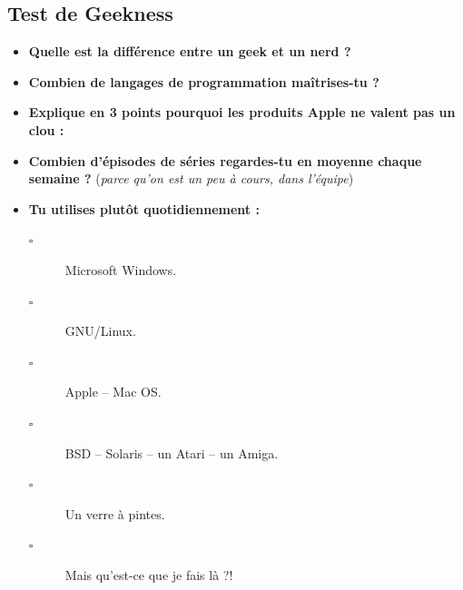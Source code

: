 \subsection*{Test de Geekness}
\begin{itemize}
    \item \textbf{Quelle est la différence entre un geek et un nerd ?}
    \vspace{1cm}
    \item \textbf{Combien de langages de programmation maîtrises-tu ?}
    \vspace{1cm}
    \item \textbf{Explique en 3 points pourquoi les produits Apple ne valent
	pas un clou :}
    \vspace{2cm}
    \item \textbf{Combien d'épisodes de séries regardes-tu en moyenne chaque
	semaine ?} (\emph{parce qu'on est un peu à cours, dans l'équipe})
    \vspace{2cm}
    
    \item \textbf{Tu utilises plutôt quotidiennement :}
    \begin{description}
	\item[$\square$] Microsoft Windows.
	\item[$\square$] GNU/Linux.
	\item[$\square$] Apple -- Mac OS.
	\item[$\square$] BSD -- Solaris -- un Atari -- un Amiga.
	\item[$\square$] Un verre à pintes.
	\item[$\square$] Mais qu'est-ce que je fais là ?!
    \end{description}


\end{itemize}
